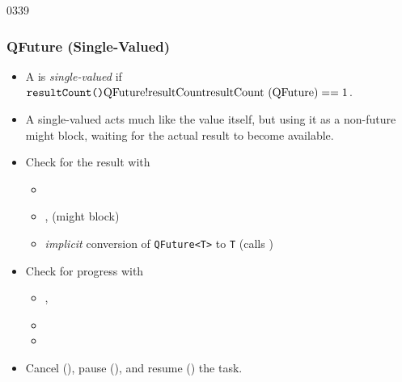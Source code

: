 \begin{slide}{0339}
\frametitle{QFuture (Single-Valued)}
  \begin{itemize}
  \item A  is \emph{single-valued} if 
    $\hbox{\hClsFn{QFuture}{resultCount}}==1$. %
  \item A single-valued  acts much like the value
    itself, but using it as a non-future might block, waiting for the
    actual result to become available.
  \item Check for the result with
    \begin{itemize}
    \item {}
    \item {},  (might block)
    \item \emph{implicit} conversion of \texttt{QFuture<T>} to
      \texttt{T} (calls )
    \end{itemize}
  \item Check for progress with
    \begin{itemize}
    \item {}, 
    \item {}
    \item {}
    \end{itemize}
  \item Cancel (), pause
    (), and resume ()
    the task.
  \end{itemize}
\end{slide}
